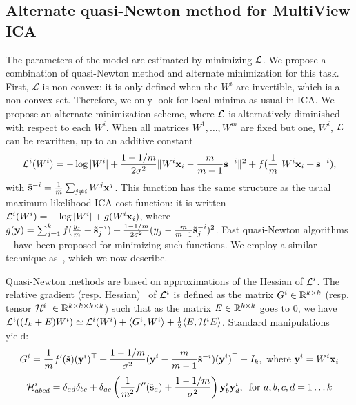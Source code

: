 \documentclass[12pt]{report}
\begin{document}
\subsection{Alternate quasi-Newton method for MultiView ICA}
%
The parameters of the model are estimated by minimizing $\mathcal{L}$.
%
We propose a combination of quasi-Newton method and alternate minimization for this task.
%
First, $\mathcal{L}$ is non-convex: it is only defined when the $W^i$ are invertible, which is a non-convex set.
%
Therefore, we only look for local minima as usual in ICA.
%
We propose an alternate minimization scheme, where $\mathcal{L}$ is alternatively diminished with respect to each $W^i$. 
%
When all matrices $W^1, \dots, W^m$ are fixed but one, $W^i$, $\mathcal{L}$ can be rewritten, up to an additive constant 
\begin{equation}
    \label{eq:indiv_loss}
    \loss^i(W^i) = -\log|W^i| + \frac{1 - 1/m}{2\sigma^2}\|W^i\xb_i - \frac{m}{m-1}\tilde{\sbb}^{-i}\|^2 + f(\frac1m W^i \xb_i +\tilde{\sbb}^{-i}), 
\end{equation}
with $\tilde{\mathbf{s}}^{-i} = \frac1m \sum_{j \neq i}W^j \mathbf{x}^j$.
%
This function has the same structure as the usual maximum-likelihood ICA cost function: it is written $\mathcal{L}^i(W^i) = -\log|W^i| + g(W^i\mathbf{x}_i)$, where $g(\mathbf{y}) = \sum_{j=1}^kf(\frac{y_j}{m} + \tilde{\mathbf{s}}^{-i}_j) + \frac{1 - 1/m}{2\sigma^2}(y_j - \frac{m}{m-1}\tilde{\mathbf{s}}^{-i}_j)^2$.
%
Fast quasi-Newton algorithms ~\cite{zibulevsky2003blind, ablin2018faster} have been proposed for minimizing such functions.
%
We employ a similar technique as~\cite{zibulevsky2003blind}, which we now describe.

Quasi-Newton methods are based on approximations of the Hessian of $\mathcal{L}^i$.
%
The relative gradient (resp. Hessian)~\cite{amari1996new, cardoso1996equivariant} of $\mathcal{L}^i$ is defined as the matrix $G^i\in \mathbb{R}^{k \times k}$ (resp. tensor $\mathcal{H}^i \in \bbR^{k\times k\times k\times k}$) such that as the matrix $E\in\mathbb{R}^{k\times k}$ goes to $0$, we have $\mathcal{L}^i((I_k + E)W^i) \simeq \mathcal{L}^i(W^i) + \langle G^i, W^i\rangle + \frac12\langle E, \mathcal{H}^iE\rangle$. Standard manipulations yield:
\begin{equation}
    \label{eq:gradient}
    G^i = \frac1mf'(\tilde{\mathbf{s}})(\mathbf{y}^i)^{\top} + \frac{1 - 1 /m}{\sigma^2}(\mathbf{y}^i - \frac{m}{m-1}\tilde{\mathbf{s}}^{-i})(\mathbf{y}^i)^{\top} - I_k, \text{ where } \mathbf{y}^i= W^i\mathbf{x}_i
\end{equation}
\begin{equation}
    \label{eq:hessian}
    \mathcal{H}^i_{abcd} = \delta_{ad}\delta_{bc} + \delta_{ac}\left(\frac{1}{m^2}f''(\tilde{\mathbf{s}}_a) + \frac{1 - 1/m}{\sigma^2}\right)\mathbf{y}^i_{b}\mathbf{y}^i_d,\enspace \text{for }a, b, c, d =1\dots k
\end{equation}
\end{document}
